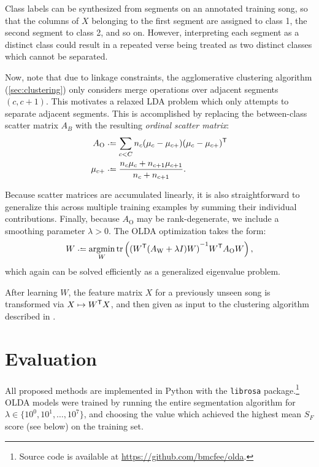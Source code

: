 \documentclass{article}
\begin{document}
Class labels can be synthesized from segments on an annotated training song, so that the columns of $X$ belonging to the first 
segment are assigned to class 1, the second segment to class 2, and so on.
However, interpreting each segment as a distinct class could result in a repeated verse being treated as two distinct classes which 
cannot be separated.  

Now, note that due to linkage constraints, the agglomerative clustering algorithm (\cref{sec:clustering}) only considers merge 
operations over adjacent segments $(c, c+1)$. This motivates a relaxed LDA problem which only attempts to separate adjacent
segments.  This is accomplished by replacing the between-class scatter matrix $A_B$ with the resulting \emph{ordinal scatter matrix}:
\begin{align*}
A_\text{O} &\defeq \sum_{c < C} n_c (\mu_c - \mu_{c+}) (\mu_c - \mu_{c+})\trans\\
\mu_{c+} &\defeq \frac{n_c \mu_c + n_{c+1} \mu_{c+1} }{n_c + n_{c+1}}.
\end{align*}

Because scatter matrices are accumulated linearly, it is also straightforward to generalize this across multiple training examples
by summing their individual contributions.  Finally, because $A_\text{O}$ may be rank-degenerate, we include a smoothing parameter
$\lambda > 0$.  The OLDA optimization takes the form:
\begin{equation}
W \defeq \argmin_W \trace\left( {(W\trans (A_\text{W} + \lambda I) W)}^{-1} W\trans A_\text{O} W \right) \label{eq:olda},
\end{equation}
which again can be solved efficiently as a generalized eigenvalue problem.

After learning $W$, the feature matrix $X$ for a previously unseen song is transformed via $X \mapsto W^\mathsf{T} X$, and then 
given as input to the clustering algorithm described in .

\section{Evaluation}
\label{sec:eval}
All proposed methods are implemented in Python with the \texttt{librosa} package.\footnote{Source code is
available at \url{https://github.com/bmcfee/olda}.}  OLDA models were trained by running the entire segmentation algorithm for
$\lambda \in \{10^0, 10^1, \dots, 10^7\}$, and choosing the value which achieved the highest mean $S_F$ score (see below) on 
the training set.
\end{document}
